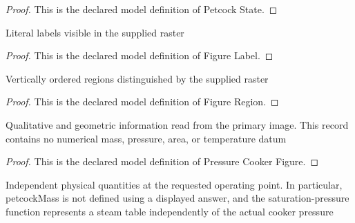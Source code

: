 \begin{proof}
  This is the declared model definition of Petcock State.
\end{proof}
\begin{definition}
  \label{def:physics:phyx-mini-0440:phyxminiproblems-problemphyxmini0440-figurelabel}
  Literal labels visible in the supplied raster
\end{definition}
\begin{proof}
  This is the declared model definition of Figure Label.
\end{proof}
\begin{definition}
  \label{def:physics:phyx-mini-0440:phyxminiproblems-problemphyxmini0440-figureregion}
  Vertically ordered regions distinguished by the supplied raster
\end{definition}
\begin{proof}
  This is the declared model definition of Figure Region.
\end{proof}
\begin{definition}
  \label{def:physics:phyx-mini-0440:phyxminiproblems-problemphyxmini0440-pressurecookerfigure}
  Qualitative and geometric information read from the primary image. This record contains no numerical mass, pressure, area, or temperature datum
\end{definition}
\begin{proof}
  This is the declared model definition of Pressure Cooker Figure.
\end{proof}
\begin{definition}
  \label{def:physics:phyx-mini-0440:phyxminiproblems-problemphyxmini0440-pressurecookersetup}
  Independent physical quantities at the requested operating point. In particular, petcockMass is not defined using a displayed answer, and the saturation-pressure function represents a steam table independently of the actual cooker pressure
\end{definition}
